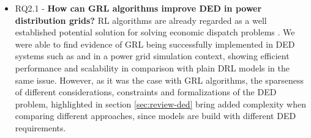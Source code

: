 \begin{itemize}
\begin{itemize}
		\item RQ2.1 - \textbf{How can \ac{GRL} algorithms improve \acf{DED} in power distribution grids?}  \ac{RL} algorithms are already regarded as a well established potential solution for solving economic dispatch problems \cite{pereraApplicationsReinforcementLearning2021}. We were able to find evidence of \ac{GRL} being successfully implemented in \ac{DED} systems such as \cite{chenScalableGraphReinforcement2023} and \cite{liNovelGraphReinforcement2022} in a power grid simulation context, showing efficient performance and scalability in comparison with plain \ac{DRL} models in the same issue. However, as it was the case with \ac{GRL} algorithms, the sparseness of different considerations, constraints and formalizations of the \ac{DED} problem, highlighted in section \ref{sec:review-ded} bring added complexity when comparing different approaches, since models are build with different \ac{DED} requirements. 
	\end{itemize}
\end{itemize}




